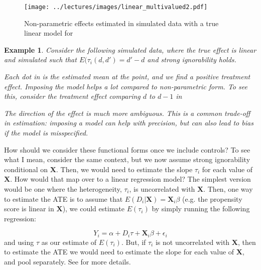 \documentclass{tufte-handout}
\theoremstyle{break}
\newtheorem{exmp}{Example}
\newcommand{\bX}{\mathbf{X}}
\begin{document}
\begin{figure*}
  \texttt{[image: ../lectures/images/linear\_multivalued2.pdf]}
  \caption{Non-parametric effects estimated in simulated data with a true linear model for }
  \label{fig:linearmodel2}
\end{figure*}
\begin{boxD}
  \begin{exmp}
    \label{exmp:linearmodel}
    Consider the following simulated data, where the true effect is linear and simulated such that $E(\tau_{i}(d, d') = d'-d$ and strong ignorability holds. 

    \hspace{10pt} Each dot in  is the estimated mean at the point, and we find a positive treatment effect. Imposing the model helps \emph{a lot} compared to non-parametric form. To see this, consider the treatment effect comparing $d$ to $d-1$ in 

    \hspace{10pt} The direction of the effect is much more ambiguous. This is a common trade-off in estimation: imposing a model can help with precision, but can also lead to bias if the model is misspecified.
  \end{exmp}
  \end{boxD}


How should we consider these functional forms once we include controls? To see what I mean, consider the same context, but we now assume strong ignorability conditional on $\bX$. Then, we would need to estimate the slope $\tau_{i}$ for each value of $\bX$. How would that map over to a linear regression model? The simplest version would be one where the heterogeneity, $\tau_{i}$, is uncorrelated with $\bX$. Then, one way to estimate the ATE is to assume that $E(D_{i} | \bX) = \bX_{i}\beta$ (e.g. the propensity score is linear in $\bX$), we could estimate $E(\tau_{i})$ by simply running the following regression:

\begin{equation}
  \label{eq:covariate_linear}
  Y_{i} = \alpha + D_{i}\tau + \bX_{i} \beta + \epsilon_{i}
\end{equation}
and using $\tau$ as our estimate of $E(\tau_{i})$. But, if $\tau_{i}$ is not uncorrelated with $\bX$, then to estimate the ATE we would need to estimate the slope for each value of $\bX$, and pool separately. See  for more details.
\end{document}
